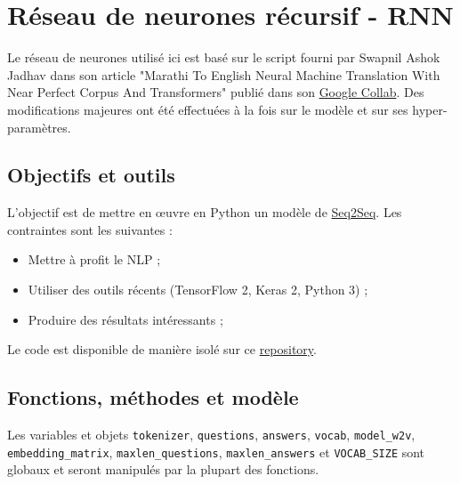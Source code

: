 \documentclass[10pt,a4paper]{article}
\newcommand\tab[1][0.5cm]{\hspace*{#1}}
\begin{document}
\section{Réseau de neurones récursif - RNN}
Le réseau de neurones utilisé ici est basé sur le script fourni par Swapnil Ashok Jadhav dans son article "Marathi To English Neural Machine Translation With Near Perfect Corpus And Transformers" publié dans son \href{https://colab.research.google.com/drive/11os3isH4I4X76dwOAQJ5cSRnfhmUziHm#scrollTo=dHBP5xzmrM4U}{Google Collab}. Des modifications majeures ont été effectuées à la fois sur le modèle et sur ses hyper-paramètres. 
\subsection{Objectifs et outils}
L'objectif est de mettre en œuvre en Python un modèle de \href{https://arxiv.org/abs/1409.3215}{Seq2Seq}. Les contraintes sont les suivantes :
\begin{itemize}
	\item Mettre à profit le NLP ;
	\item Utiliser des outils récents (TensorFlow 2, Keras 2, Python 3) ;
	\item Produire des résultats intéressants ;
\end{itemize}
\tab Le code est disponible de manière isolé sur ce \href{https://github.com/LaraProject/seq2seq}{repository}.
\subsection{Fonctions, méthodes et modèle}
Les variables et objets \texttt{tokenizer}, \texttt{questions}, \texttt{answers}, \texttt{vocab}, \texttt{model\_w2v}, \texttt{embedding\_matrix}, \texttt{maxlen\_questions}, \texttt{maxlen\_answers} et \texttt{VOCAB\_SIZE} sont globaux et seront manipulés par la plupart des fonctions.
\end{document}
